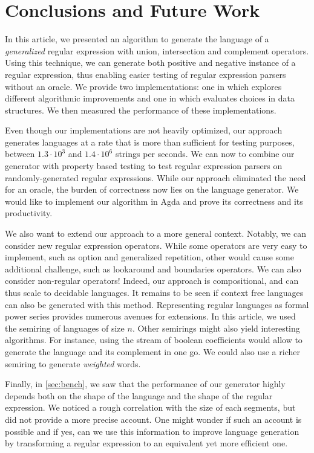 \section{Conclusions and Future Work}
\label{sec:conclusions}

In this article, we presented an algorithm to generate the language
of a \emph{generalized} regular expression with union, intersection
and complement operators. Using this technique, we can generate both
positive and negative instance of a regular expression, thus enabling
easier testing of regular expression parsers without an oracle.
We provide two implementations: one in \haskell which explores
different algorithmic improvements and one in \ocaml which evaluates choices
in data structures. We then measured the performance of these implementations.

Even though our implementations are not heavily optimized, our approach generates
languages at a rate that is more than sufficient for testing
purposes, between $1.3\cdot10^3$ and $1.4\cdot10^6$ strings per seconds.
We can now to combine our generator with property based testing
to test regular expression parsers on randomly-generated regular expressions.
While our approach eliminated the need for an oracle, the burden of correctness
now lies on the language generator. We would like to implement our algorithm
in Agda and prove its correctness and its productivity.

We also want to extend our approach to a more general context.
Notably, we can consider new regular expression operators.
While some operators are very easy to implement, such as option and generalized repetition,
other would cause some additional challenge, such as lookaround and boundaries
operators. We can also consider non-regular operators! Indeed, our approach
is compositional, and can thus scale to decidable languages.
It remains to be seen if context free languages can also be generated
with this method.
Representing regular languages as formal power series provides numerous avenues
for extensions. In this article, we used the semiring
of languages of size $n$. Other semirings might also yield interesting
algorithms. For instance, using the stream of boolean coefficients would
allow to generate the language and its complement in one go. We could
also use a richer semiring to generate \emph{weighted} words.

Finally, in \cref{sec:bench}, we saw that the performance of our
generator highly depends
both on the shape of the language and the shape of the regular expression.
We noticed a rough correlation with the size of each segments, but did not
provide a more precise account. One might wonder if such an account is possible
and if yes, can we use this information to improve language generation
by transforming a regular expression to an equivalent yet more efficient one.

